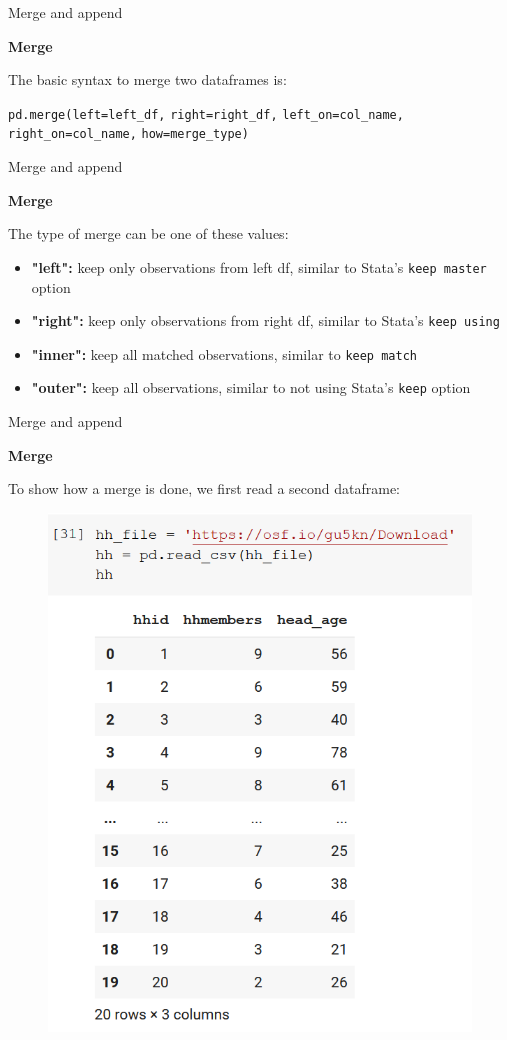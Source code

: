 \documentclass[aspectratio=169]{beamer}
\begin{document}
\begin{frame}{Merge and append}

	\textbf{Merge}

	The basic syntax to merge two dataframes is:

	\hspace{7mm} \texttt{pd.merge(left=left\_df,}
	\newline \hspace*{25.5mm} \texttt{right=right\_df,}
	\newline \hspace*{25.5mm} \texttt{left\_on=col\_name,}
	\newline \hspace*{25.5mm} \texttt{right\_on=col\_name,}
	\newline \hspace*{25.5mm} \texttt{how=merge\_type)}

\end{frame}

\begin{frame}{Merge and append}

	\textbf{Merge}

	The type of merge can be one of these values:

	\begin{itemize}
		\item \textbf{"left":} keep only observations from left df, similar to Stata's \texttt{keep master} option
		\item \textbf{"right":} keep only observations from right df, similar to Stata's \texttt{keep using}
		\item \textbf{"inner":} keep all matched observations, similar to \texttt{keep match}
		\item \textbf{"outer":} keep all observations, similar to not using Stata's \texttt{keep} option
	\end{itemize}

\end{frame}

\begin{frame}{Merge and append}

	\textbf{Merge}

	To show how a merge is done, we first read a second dataframe:

	\begin{figure}
		\centering
		\includegraphics[width=0.33\linewidth]{img/hh_df.png}
	\end{figure}

\end{frame}
\end{document}
